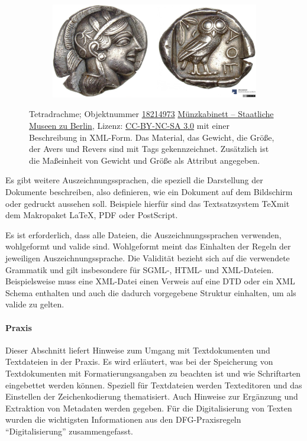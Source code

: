 \begin{figure}
	\begin{subfigure}{.585\textwidth}
		\centering
		\includegraphics[width=\linewidth]{bilder/text_muenze}
	\end{subfigure}\linebreak
	\begin{subfigure}{.585\textwidth}
		\usebox{\muenze}
	\end{subfigure}
	\caption{Tetradrachme; Objektnummer \href{http://ww2.smb.museum/ikmk/object.php?id=18214973}{18214973} \href{http://ww2.smb.museum/ikmk/index.php}{Münzkabinett -- Staatliche Museen zu Berlin}, Lizenz: \href{http://creativecommons.org/licenses/by-nc-sa/3.0/de/}{CC-BY-NC-SA 3.0} mit einer Beschreibung in XML-Form. Das Material, das Gewicht, die Größe, der Avers und Revers sind mit Tags gekennzeichnet. Zusätzlich ist die Maßeinheit von Gewicht und Größe als Attribut angegeben.}
\end{figure}

Es gibt weitere Auszeichnungssprachen, die speziell die Darstellung der Dokumente beschreiben, also definieren, wie ein Dokument auf dem Bildschirm oder gedruckt aussehen soll. Beispiele hierfür sind das Textsatzsystem \TeX  mit dem Makropaket \LaTeX, PDF oder PostScript.

Es ist erforderlich, dass alle Dateien, die Auszeichnungssprachen verwenden, wohlgeformt und valide sind. Wohlgeformt meint das Einhalten der Regeln der jeweiligen Auszeichnungssprache. Die Validität bezieht sich auf die verwendete Grammatik und gilt insbesondere für SGML-, HTML- und XML-Dateien. Beispielsweise muss eine XML-Datei einen Verweis auf eine DTD oder ein XML Schema enthalten und auch die dadurch vorgegebene Struktur einhalten, um als valide zu gelten.


\paragraph{Praxis}
Dieser Abschnitt liefert Hinweise zum Umgang mit Textdokumenten und Textdateien in der Praxis. Es wird erläutert, was bei der Speicherung von Textdokumenten mit Formatierungsangaben zu beachten ist und wie Schriftarten eingebettet werden können. Speziell für Textdateien werden Texteditoren und das Einstellen der Zeichenkodierung thematisiert. Auch Hinweise zur Ergänzung und Extraktion von Metadaten werden gegeben. Für die Digitalisierung von Texten wurden die wichtigsten Informationen aus den DFG-Praxisregeln "`Digitalisierung"' zusammengefasst.

